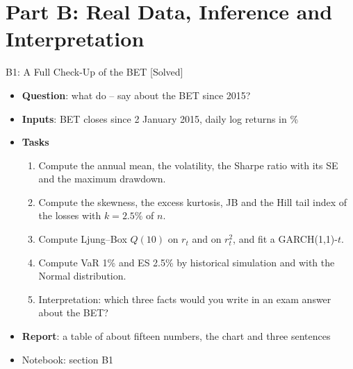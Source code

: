 \section{Part B: Real Data, Inference and Interpretation}

\begin{frame}{B1: A Full Check-Up of the BET [Solved]}
\itemsize{\footnotesize}
\begin{itemize}
\item \textbf{Question}: what do -- say about the BET since 2015?
\item \textbf{Inputs}: BET closes since 2 January 2015, daily log returns in \%
\item \textbf{Tasks}
\begin{enumerate}
    \item Compute the annual mean, the volatility, the Sharpe ratio with its SE and the maximum drawdown.
    \item Compute the skewness, the excess kurtosis, JB and the Hill tail index of the losses with $k = 2.5\%$ of $n$.
    \item Compute Ljung--Box $Q(10)$ on $r_t$ and on $r_t^2$, and fit a GARCH(1,1)-$t$.
    \item Compute VaR 1\% and ES 2.5\% by historical simulation and with the Normal distribution.
    \item Interpretation: which three facts would you write in an exam answer about the BET?
\end{enumerate}
\item \textbf{Report}: a table of about fifteen numbers, the chart and three sentences
\item Notebook: section B1
\end{itemize}
\end{frame}

